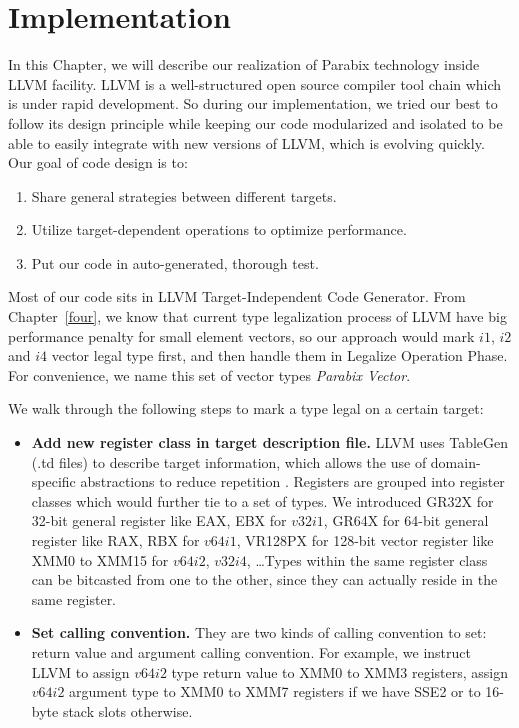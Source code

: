 %
%

\chapter{Implementation}
\label{five}

In this Chapter, we will describe our realization of Parabix technology inside LLVM facility. LLVM is a well-structured open source compiler tool chain which is under rapid development. So during our implementation, we tried our best to follow its design principle while keeping our code modularized and isolated to be able to easily integrate with new versions of LLVM, which is evolving quickly.  Our goal of code design is to:
\begin{enumerate}
  \item Share general strategies between different targets.
  \item Utilize target-dependent operations to optimize performance.
  \item Put our code in auto-generated, thorough test.
\end{enumerate}

Most of our code sits in LLVM Target-Independent Code Generator\cite{llvm_code_gen}. From Chapter~\ref{four}, we know that current type legalization process of LLVM have big performance penalty for small element vectors, so our approach would mark $i1$, $i2$ and $i4$ vector legal type first, and then handle them in Legalize Operation Phase. For convenience, we name this set of vector types \textit{Parabix Vector}.

We walk through the following steps to mark a type legal on a certain target:
\begin{itemize}
  \item \textbf{Add new register class in target description file.} LLVM uses TableGen (.td files) to describe target information, which allows the use of domain-specific abstractions to reduce repetition \cite{llvm_code_gen}. Registers are grouped into register classes which would further tie to a set of types. We introduced GR32X for 32-bit general register like EAX, EBX for $v32i1$, GR64X for 64-bit general register like RAX, RBX for $v64i1$, VR128PX for 128-bit vector register like XMM0 to XMM15 for $v64i2$, $v32i4$, \ldots Types within the same register class can be bitcasted from one to the other, since they can actually reside in the same register.

  \item \textbf{Set calling convention.} They are two kinds of calling convention to set: return value and argument calling convention. For example, we instruct LLVM to assign $v64i2$ type return value to XMM0 to XMM3 registers, assign $v64i2$ argument type to XMM0 to XMM7 registers if we have SSE2 or to 16-byte stack slots otherwise.
\end{itemize}

